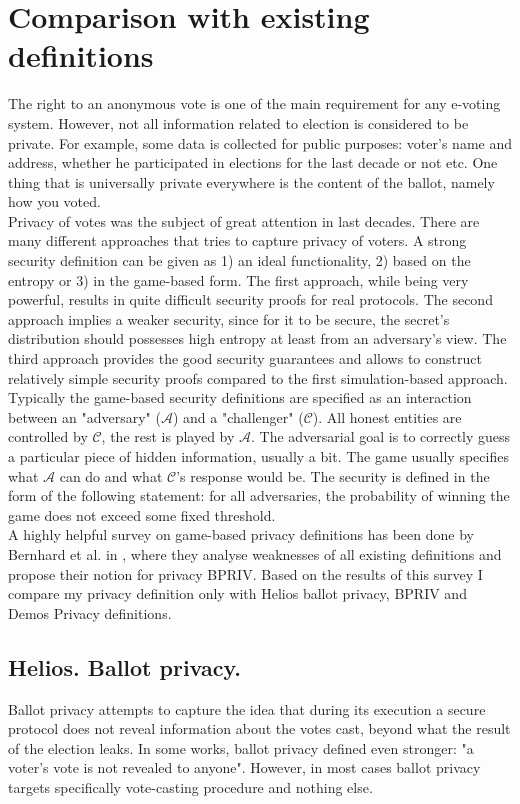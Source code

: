  \section{Comparison with existing definitions}
The right to an anonymous vote is one of the main requirement for any e-voting system. However, not all information related to election is considered to be private. For example, some data is collected for public purposes: voter's name and address, whether he participated in elections for the last decade or not etc.  One thing that is universally private everywhere is the content of the ballot, namely how you voted.\\

 Privacy of votes was the subject of great attention in last decades. There are many different approaches that tries to capture privacy of voters. A strong security definition can be given  as 1) an ideal functionality, 2) based on the entropy or 3) in the game-based form. The first approach, while being very powerful, results in quite difficult security proofs for real protocols. The second approach implies a weaker security, since for it to be secure, the secret's distribution should possesses high entropy at least from an adversary's view. The third approach provides the good security guarantees and allows to construct relatively simple security proofs compared to the first simulation-based approach.\\
 
Typically the game-based security definitions are specified as an interaction between  an "adversary" ($\mathcal{A}$) and a "challenger" ($\mathcal{C}$). All honest entities are controlled by $\mathcal{C}$, the rest is played by $\mathcal{A}$. The adversarial goal is to correctly guess a particular piece of hidden information, usually a bit. The game usually specifies what $\mathcal{A}$ can do and what $\mathcal{C}$'s response would be.  The security is defined in the form of the following statement: for all adversaries, the probability of winning the game does not exceed some fixed threshold.\\

A highly helpful survey on game-based privacy definitions has been done by Bernhard et al. in \cite{Bernhard2015}, where they analyse weaknesses of all existing definitions and propose their notion for privacy BPRIV. Based on the results of this survey I compare my privacy definition only with Helios ballot privacy, BPRIV and Demos Privacy definitions. 
 \subsection{Helios. Ballot privacy.}
 Ballot privacy attempts to capture the idea that during its execution a secure protocol does not reveal information about the votes cast, beyond what the result of the election leaks. In some works, ballot privacy defined even stronger: "a voter's vote is not revealed to anyone". However, in most cases ballot privacy targets specifically vote-casting procedure  and nothing else.\\ 
  
